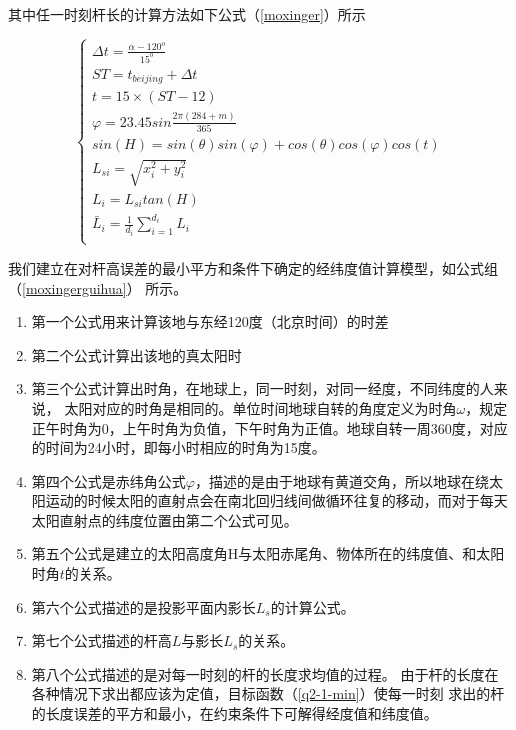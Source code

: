 \documentclass[withoutpreface,bwprint]{cumcmthesis} %
\begin{document}
其中任一时刻杆长的计算方法如下公式（\ref{moxinger}）所示

\begin{equation}
\label{moxinger}
\left\{  
  	\begin{array}{lr} 
  		\Delta t = \frac{\alpha - 120^o}{15^o}\\
  		ST = t_{beijing} + \Delta t\\
  		t = 15\times (ST - 12)\\
  		\varphi = 23.45 sin \frac{2\pi(284+m)}{365}\\
  		sin(H) = sin(\theta)sin(\varphi)+cos(\theta)cos(\varphi)cos(t)\\
  		L_{si} = \sqrt{x_i^2+y_i^2}\\
  		L_i = L_{si}tan(H)\\
  		\bar{L}_i  = \frac{1}{d_i}\sum\limits_{i=1}^{d_i} L_i\\
	\end{array}  
\right.  
\end{equation}

\par 我们建⽴在对杆⾼误差的最⼩平⽅和条件下确定的经纬度值计算模型，如公式组（\ref{moxingerguihua}） 所⽰。


\begin{enumerate}
	\item 第一个公式用来计算该地与东经120度（北京时间）的时差
	\item 第二个公式计算出该地的真太阳时
	\item 第三个公式计算出时⾓，在地球上，同⼀时刻，对同⼀经度，不同纬度的⼈来说， 太阳对应的时⾓是相同的。单位时间地球⾃转的⾓度定义为时⾓$\omega$，规定正午时⾓为0，上午时⾓为负值，下午时⾓为正值。地球⾃转⼀周360度，对应的时间为24⼩时，即每⼩时相应的时⾓为15度。
	\item 第四个公式是⾚纬⾓公式$\varphi$，描述的是由于地球有黄道交⾓，所以地球在绕太阳运动的时候太阳的直射点会在南北回归线间做循环往复的移动，⽽对于每天太阳直射点的纬度位置由第⼆个公式可见。
	\item 第五个公式是建⽴的太阳⾼度⾓H与太阳⾚尾⾓、物体所在的纬度值、和太阳时⾓$t$的关系。
	\item 第六个公式描述的是投影平⾯内影长$L_s$的计算公式。
	\item 第七个公式描述的杆⾼$L$与影长$L_s$的关系。 
	\item 第八个公式描述的是对每⼀时刻的杆的长度求均值的过程。 
由于杆的长度在各种情况下求出都应该为定值，⽬标函数（\ref{q2-1-min}）使每⼀时刻 求出的杆的长度误差的平⽅和最⼩，在约束条件下可解得经度值和纬度值。
\end{enumerate}
\end{document}
